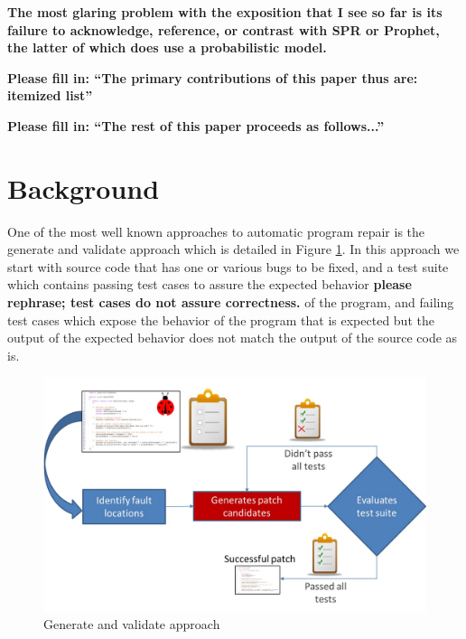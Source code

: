 \documentclass[conference]{IEEEtran}
\newcommand{\todo}[1]
  {{\scriptsize \textbf{\color{red} {#1}}}}
\begin{document}
{{%



\todo{The most glaring problem with the exposition that I see so far is its
  failure to acknowledge, reference, or contrast with SPR or Prophet, the latter of which does use a
  probabilistic model.}

\todo{Please fill in: ``The primary contributions of this paper thus are:
  itemized list''}



\todo{Please fill in: ``The rest of this paper proceeds as follows...''}

\section{Background}


One of the most well known approaches to automatic program repair is the
generate and validate approach which is detailed in Figure
\ref{fig:generateandvalidate}. In this approach we start with source code that
has one or various bugs to be fixed, and a test suite which contains passing
test cases to assure the expected behavior\todo{please rephrase; test cases do
  not assure correctness.} of the program, and failing test 
cases which expose the behavior of the program that is expected but the output
of the expected behavior does not match the output of the source code as is.



\begin{figure}[!h]
  \centering
    \includegraphics[scale=0.25]{Picture1}
  \caption{Generate and validate approach}
  \label{fig:generateandvalidate}
\end{figure}

}}
\end{document}
